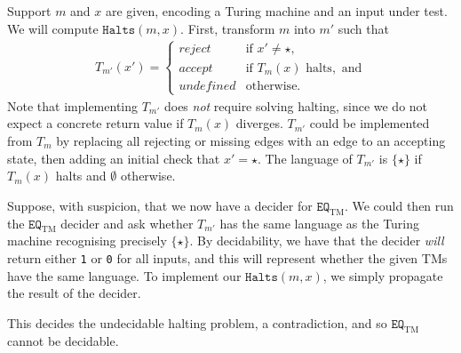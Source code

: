 \documentclass[a4paper]{article}
\begin{document}
Support $m$ and $x$ are given, encoding a Turing machine and an input under test.
We will compute $\texttt{Halts}(m, x)$.
First, transform $m$ into $m'$ such that
\begin{align*}
  T_{m'}(x') = \begin{cases}
    \textit{reject} &\text{if }x' \ne \text{$\star$}, \\
    \textit{accept} &\text{if }T_m(x)\text{ halts},\text{ and}\\
    \textit{undefined} & \text{otherwise}.
  \end{cases}
\end{align*}
Note that implementing $T_{m'}$ does \textit{not} require solving halting,
since we do not expect a concrete return value if $T_m(x)$ diverges.
$T_{m'}$ could be implemented from $T_m$ by %
replacing all rejecting or missing edges
with an edge to an accepting state, 
then adding an initial check that $x' = \text{$\star$}$.
The language of $T_{m'}$ is $\{\text{$\star$}\}$ if $T_m(x)$
halts and $\emptyset$ otherwise.





Suppose, with suspicion, that we now have a decider for $\texttt{EQ}_{\text{TM}}$.
We could then run the 
$\texttt{EQ}_{\text{TM}}$
decider and ask whether
$T_{m'}$ has the same language as the Turing machine recognising precisely $\{\star\}$.
By decidability, we have that the decider \textit{will} return either \texttt 1 or \texttt 0
for all inputs,
and this will represent whether the given TMs have the same language.
To implement our
$\texttt{Halts}(m, x)$,
we simply propagate the result of the decider.

This decides the undecidable halting problem, a contradiction, and so $\texttt{EQ}_{\text{TM}}$
cannot be decidable.



\end{document}
